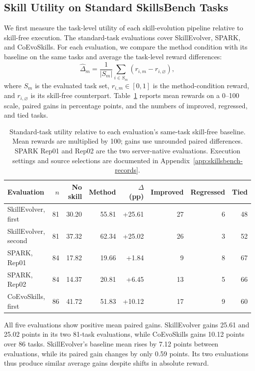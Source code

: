\subsection{Skill Utility on Standard SkillsBench Tasks}
We first measure the task-level utility of each skill-evolution pipeline relative to skill-free execution. The standard-task evaluations cover SkillEvolver, SPARK, and CoEvoSkills. For each evaluation, we compare the method condition with its baseline on the same tasks and average the task-level reward differences:
\begin{equation}
\widehat{\Delta}_m = \frac{1}{|S_m|}\sum_{i\in S_m}\left(r_{i,m}-r_{i,\varnothing}\right),
\end{equation}
where $S_m$ is the evaluated task set, $r_{i,m}\in[0,1]$ is the method-condition reward, and $r_{i,\varnothing}$ is its skill-free counterpart. Table~\ref{tab:skillsbench-standard-utility} reports mean rewards on a 0--100 scale, paired gains in percentage points, and the numbers of improved, regressed, and tied tasks.

\begin{table}[t]
\centering\small
\setlength{\tabcolsep}{5pt}
\begin{tabular}{lrrrrrrr}
\toprule
Evaluation & $n$ & No skill & Method & $\Delta$ (pp) & Improved & Regressed & Tied\\
\midrule
SkillEvolver, first & 81 & 30.20 & 55.81 & +25.61 & 27 & 6 & 48\\
SkillEvolver, second & 81 & 37.32 & 62.34 & +25.02 & 26 & 3 & 52\\
SPARK, Rep01 & 84 & 17.82 & 19.66 & +1.84 & 9 & 8 & 67\\
SPARK, Rep02 & 84 & 14.37 & 20.81 & +6.45 & 13 & 5 & 66\\
CoEvoSkills, first & 86 & 41.72 & 51.83 & +10.12 & 17 & 9 & 60\\
\bottomrule
\end{tabular}
\caption{Standard-task utility relative to each evaluation's same-task skill-free baseline. Mean rewards are multiplied by 100; gains use unrounded paired differences. SPARK Rep01 and Rep02 are the two server-native evaluations. Execution settings and source selections are documented in Appendix~\ref{app:skillsbench-records}.}
\label{tab:skillsbench-standard-utility}
\end{table}

All five evaluations show positive mean paired gains. SkillEvolver gains 25.61 and 25.02 points in its two 81-task evaluations, while CoEvoSkills gains 10.12 points over 86 tasks. SkillEvolver's baseline mean rises by 7.12 points between evaluations, while its paired gain changes by only 0.59 points. Its two evaluations thus produce similar average gains despite shifts in absolute reward.

